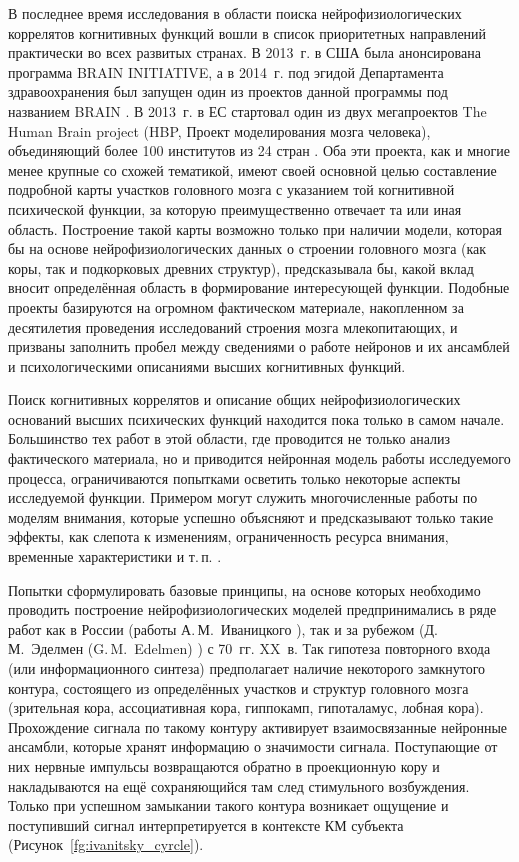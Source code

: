 В последнее время исследования в области поиска нейрофизиологических коррелятов когнитивных функций вошли в список приоритетных направлений практически во всех развитых странах. В 2013~г. в США была анонсирована программа BRAIN INITIATIVE, а в 2014~г. под эгидой Департамента здравоохранения был запущен один из проектов данной программы под названием BRAIN \cite{NIH2014}. В 2013~г. в ЕС стартовал один из двух мегапроектов The Human Brain project (HBP, Проект моделирования мозга человека), объединяющий более 100 институтов из 24 стран \cite{HBP2014}. Оба эти проекта, как и многие менее крупные со схожей тематикой, имеют своей основной целью составление подробной карты участков головного мозга с указанием той когнитивной психической функции, за которую преимущественно отвечает та или иная область. Построение такой карты возможно только при наличии модели, которая бы на основе нейрофизиологических данных о строении головного мозга (как коры, так и подкорковых древних структур), предсказывала бы, какой вклад вносит определённая область в формирование интересующей функции. Подобные проекты базируются на огромном фактическом материале, накопленном за десятилетия проведения исследований строения мозга млекопитающих, и призваны заполнить пробел между сведениями о работе нейронов и их ансамблей и психологическими описаниями высших когнитивных функций. 

Поиск когнитивных коррелятов и описание общих нейрофизиологических оснований высших психических функций находится пока только в самом начале. Большинство тех работ в этой области, где проводится не только анализ фактического материала, но и приводится нейронная модель работы исследуемого процесса, ограничиваются попытками осветить только некоторые аспекты исследуемой функции. Примером могут служить многочисленные работы по моделям внимания, которые успешно объясняют и предсказывают только такие эффекты, как слепота к изменениям, ограниченность ресурса внимания, временные характеристики и т.\,п. \cite{Borji2013}.

Попытки сформулировать базовые принципы, на основе которых необходимо проводить построение нейрофизиологических моделей предпринимались в ряде работ как в России (работы А.\,М.~Иваницкого \cite{Ivanitsky1996,IvanitskyE1996}), так и за рубежом (Д.\,М.~Эделмен (G.\,M.~Edelmen) \cite{Edelmen1981}) с 70~гг. XX~в. Так гипотеза повторного входа (или информационного синтеза) предполагает наличие некоторого замкнутого контура, состоящего из определённых участков и структур головного мозга (зрительная кора, ассоциативная кора, гиппокамп, гипоталамус, лобная кора). Прохождение сигнала по такому контуру активирует взаимосвязанные нейронные ансамбли, которые хранят информацию о значимости сигнала. Поступающие от них нервные импульсы возвращаются обратно в проекционную кору и накладываются на ещё сохраняющийся там след стимульного возбуждения. Только при успешном замыкании такого контура возникает ощущение и поступивший сигнал интерпретируется в контексте КМ субъекта (Рисунок~\ref{fg:ivanitsky_cyrcle}). 

